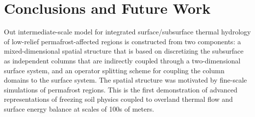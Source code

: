 \documentclass[review]{elsarticle}
\begin{document}
\section{Conclusions and Future Work}\label{conclusion}

Out intermediate-scale model for integrated surface/subsurface thermal hydrology of low-relief permafrost-affected regions is constructed from two components: a mixed-dimensional spatial structure that is based on discretizing  the subsurface as independent columns that are indirectly coupled through a two-dimensional surface system, and an operator splitting scheme for coupling the column domains to the surface system. The spatial structure was motivated by fine-scale simulations of permafrost regions. This is the first demonstration of advanced representations of freezing soil physics coupled to overland thermal flow and surface energy balance at scales of 100s of meters.

  


\end{document}
